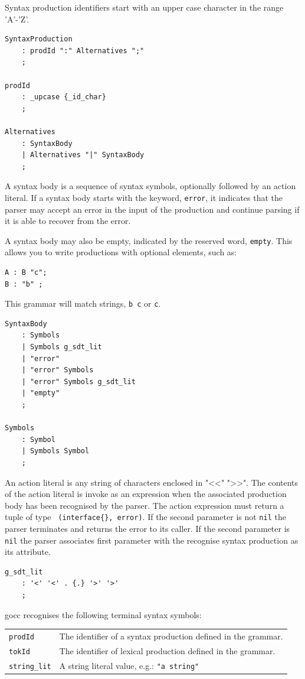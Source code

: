 \documentclass[12pt]{article}
\begin{document}
Syntax  production identifiers start with an upper case character in the range 'A'-'Z'.

\begin{Verbatim}[frame=single]
SyntaxProduction
    : prodId ":" Alternatives ";"
    ;

prodId
    : _upcase {_id_char}
    ;

Alternatives
    : SyntaxBody
    | Alternatives "|" SyntaxBody
    ;
\end{Verbatim}

A syntax body is a sequence of syntax symbols, optionally followed by an action literal. If a syntax body starts with the keyword, \verb|error|, it indicates that the parser may accept an error in the input of the production and continue parsing if it is able to recover from the error.

A syntax body may also be empty, indicated by the reserved word, \verb|empty|. This allows you to write productions with optional elements, such as:

\begin{verbatim}
A : B "c";
B : "b" ;
\end{verbatim}

This grammar will match strings, \verb|b c| or \verb|c|.

\begin{Verbatim}[frame=single]
SyntaxBody
    : Symbols
    | Symbols g_sdt_lit
    | "error"
    | "error" Symbols
    | "error" Symbols g_sdt_lit
    | "empty"
    ;

Symbols
    : Symbol
    | Symbols Symbol
    ;
\end{Verbatim}

An action literal is any string of characters enclosed in "<<" ">>". The contents of the action literal is invoke as an expression when the associated production body has been recognised by the parser. The action expression must return a tuple of type \verb| (interface{}, error)|. If the second parameter is not \verb|nil| the parser terminates and returns the error to its caller. If the second parameter is \verb|nil| the parser associates first parameter with the recognise syntax production as its attribute.

\begin{Verbatim}[frame=single]
g_sdt_lit
    : '<' '<' . {.} '>' '>'
    ;
\end{Verbatim}

gocc recognises the following terminal syntax symbols:

\begin{longtable}{ll}
	\verb|prodId| & The identifier of a syntax production defined in the grammar. \\
	\verb|tokId| & The identifier of lexical production defined in the grammar. \\
	\verb|string_lit| & A string literal value, e.g.: \verb|"a string"| \\
\end{longtable}
\end{document}
